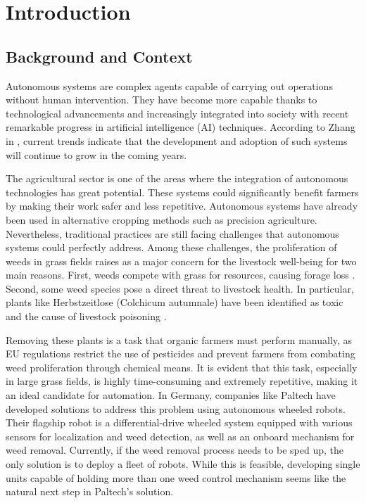 \chapter{Introduction}\label{ch:introduction}
\section{Background and Context}
Autonomous systems are complex agents capable of carrying out operations without human intervention. They have become more capable thanks to technological advancements and increasingly integrated into society with recent remarkable progress in artificial intelligence (AI) techniques. According to Zhang in \cite{Zhang2017}, current trends indicate that the development and adoption of such systems will continue to grow in the coming years.

The agricultural sector is one of the areas where the integration of autonomous technologies has great potential. These systems could significantly benefit farmers by making their work safer and less repetitive. Autonomous systems have already been used in alternative cropping methods such as precision agriculture. Nevertheless, traditional practices are still facing challenges that autonomous systems could perfectly address. Among these challenges, the proliferation of weeds in grass fields raises as a major concern for the livestock well-being for two main reasons. First, weeds compete with grass for resources, causing forage loss \cite{Klotzli2024}. Second, some weed species pose a direct threat to livestock health. In particular, plants like Herbstzeitlose (Colchicum autumnale) have been identified as toxic and the cause of livestock poisoning \cite{Mueller2022}.

Removing these plants is a task that organic farmers must perform manually, as EU regulations restrict the use of pesticides and prevent farmers from combating weed proliferation through chemical means. It is evident that this task, especially in large grass fields, is highly time-consuming and extremely repetitive, making it an ideal candidate for automation. In Germany, companies like Paltech have developed solutions to address this problem using autonomous wheeled robots. Their flagship robot is a differential-drive wheeled system equipped with various sensors for localization and weed detection, as well as an onboard mechanism for weed removal. Currently, if the weed removal process needs to be sped up, the only solution is to deploy a fleet of robots. While this is feasible, developing single units capable of holding more than one weed control mechanism seems like the natural next step in Paltech's solution.

